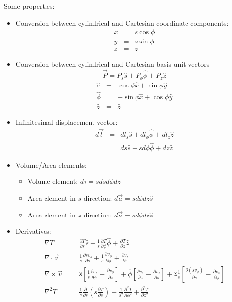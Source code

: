 \documentclass[12pt,a4paper,twoside]{article}
\numberwithin{equation}{section}
\begin{document}
	\noindent Some properties:
	\begin{itemize}
		\item Conversion between cylindrical and Cartesian coordinate components:
		\begin{eqnarray*}
			x &=& s\cos\phi\\
			y &=& s\sin\phi\\
			z &=& z
		\end{eqnarray*}
		\item Conversion between cylindrical and Cartesian basis unit vectors 
		\[\overrightarrow{P}=P_s\hat{s}+P_\phi\hat{\phi}+P_z\hat{z}\]
		\begin{eqnarray*}
			\hat{s} &=& \cos\phi\hat{x} + \sin\phi\hat{y}\\
			\hat{\phi} &=& -\sin\phi\hat{x} + \cos\phi\hat{y}\\
			\hat{z} &=& \hat{z}
		\end{eqnarray*}
		\item Infinitesimal displacement vector:
		\begin{eqnarray*}
			d\overrightarrow{l} &=& dl_s\hat{s}+dl_\phi\hat{\phi}+dl_z\hat{z}\\
			&=& ds\hat{s}+sd\phi\hat{\phi}+dz\hat{z}
		\end{eqnarray*}
		
		\item Volume/Area elements:
		\begin{itemize}
			\item Volume element: \(d\tau=sdsd\phi dz\)
			\item Area element in $s$ direction: \(d\overrightarrow{a}=sd\phi dz\hat{s}\)
			\item Area element in $z$ direction: \(d\overrightarrow{a}=sd\phi dz\hat{z}\)
		\end{itemize}
		\item Derivatives:
		\begin{eqnarray*}
			\nabla T &=& \frac{\partial T}{\partial s}\hat{s}+\frac{1}{s}\frac{\partial T}{\partial \phi}\hat{\phi}+\frac{\partial T}{\partial z}\hat{z}\\
			\nabla \cdot \overrightarrow{v} &=& \frac{1}{s}\frac{\partial sv_s}{\partial s} +\frac{1}{s}\frac{\partial v_\phi}{\partial \phi}+\frac{\partial v_z}{\partial z}\\
			\nabla \times \overrightarrow{v} &=& \hat{s}\left[\frac{1}{s}\frac{\partial v_z}{\partial \phi}-\frac{\partial v_\phi}{\partial z}\right]+\hat{\phi}\left[\frac{\partial v_s}{\partial z}-\frac{\partial v_z}{\partial s}\right]+\hat{z}\frac{1}{s}\left[\frac{\partial (sv_\phi)}{\partial s}-\frac{\partial v_s}{\partial \phi}\right]\\
			\nabla^2T &=& \frac{1}{s}\frac{\partial}{\partial s}\left(s\frac{\partial T}{\partial s}\right) + \frac{1}{s^2}\frac{\partial^2 T}{\partial\phi^2}+\frac{\partial^2T}{\partial z^2}
		\end{eqnarray*}
	\end{itemize}
	
\end{document}
